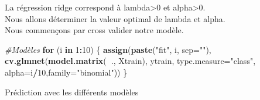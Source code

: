\documentclass[
]{article}
\newenvironment{Shaded}{\begin{snugshade}}{\end{snugshade}}
\newcommand{\CommentTok}[1]{\textcolor[rgb]{0.56,0.35,0.01}{\textit{#1}}}
\newcommand{\ControlFlowTok}[1]{\textcolor[rgb]{0.13,0.29,0.53}{\textbf{#1}}}
\newcommand{\DataTypeTok}[1]{\textcolor[rgb]{0.13,0.29,0.53}{#1}}
\newcommand{\DecValTok}[1]{\textcolor[rgb]{0.00,0.00,0.81}{#1}}
\newcommand{\KeywordTok}[1]{\textcolor[rgb]{0.13,0.29,0.53}{\textbf{#1}}}
\newcommand{\NormalTok}[1]{#1}
\newcommand{\OperatorTok}[1]{\textcolor[rgb]{0.81,0.36,0.00}{\textbf{#1}}}
\newcommand{\StringTok}[1]{\textcolor[rgb]{0.31,0.60,0.02}{#1}}
\begin{document}
La régression ridge correspond à lambda\textgreater0 et
alpha\textgreater0.\\
Nous allons déterminer la valeur optimal de lambda et alpha.\\
Nous commençons par cross valider notre modèle.

\begin{Shaded}
\begin{Highlighting}[]
\CommentTok{#Modèles}
\ControlFlowTok{for}\NormalTok{ (i }\ControlFlowTok{in} \DecValTok{1}\OperatorTok{:}\DecValTok{10}\NormalTok{) \{}
  \KeywordTok{assign}\NormalTok{(}\KeywordTok{paste}\NormalTok{(}\StringTok{"fit"}\NormalTok{, i, }\DataTypeTok{sep=}\StringTok{""}\NormalTok{), }\KeywordTok{cv.glmnet}\NormalTok{(}\KeywordTok{model.matrix}\NormalTok{(}\OperatorTok{~}\NormalTok{., Xtrain), ytrain, }\DataTypeTok{type.measure=}\StringTok{"class"}\NormalTok{, }\DataTypeTok{alpha=}\NormalTok{i}\OperatorTok{/}\DecValTok{10}\NormalTok{,}\DataTypeTok{family=}\StringTok{"binomial"}\NormalTok{))}
\NormalTok{\}}
\end{Highlighting}
\end{Shaded}

Prédiction avec les différents modèles
\end{document}

